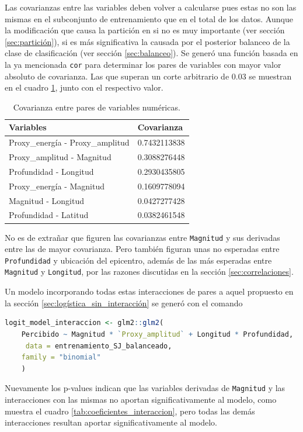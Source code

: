 \documentclass[a4paper]{report}
\begin{document}
Las covarianzas entre las variables deben volver a calcularse pues estas no son las mismas en el subconjunto de entrenamiento que en el total de los datos.
Aunque la modificación que causa la partición en si no es muy importante (ver sección \ref{sec:partición}), si es más significativa la causada por el posterior balanceo de la clase de clasificación (ver sección \ref{sec:balanceo}).
Se generó una función basada en la ya mencionada \lstinline[language=R]{cor} para determinar los pares de variables con mayor valor absoluto de covarianza.
Las que superan un corte arbitrario de \num{0.03} se muestran en el cuadro \ref{tab:covarianza}, junto con el respectivo valor.

\begin{table}[!ht]
	\centering
	\begin{tabular}{ll}
		\toprule
		Variables & Covarianza\\
		\midrule
		Proxy\_energía - Proxy\_amplitud & 0.7432113838\\
		Proxy\_amplitud - Magnitud & 0.3088276448\\
		Profundidad - Longitud & 0.2930435805\\
		Proxy\_energía - Magnitud & 0.1609778094\\
		Magnitud - Longitud & 0.0427277428\\
		Profundidad - Latitud & 0.0382461548\\
		\bottomrule
	\end{tabular}
	\caption{Covarianza entre pares de variables numéricas.}
	\label{tab:covarianza}
\end{table}
No es de extrañar que figuren las covarianzas entre \verb'Magnitud' y sus derivadas entre las de mayor covarianza.
Pero también figuran unas no esperadas entre \verb'Profundidad' y ubicación del epicentro, además de las más esperadas entre \verb'Magnitud' y \verb'Longitud', por las razones discutidas en la sección \ref{sec:correlaciones}.

Un modelo incorporando todas estas interacciones de pares a aquel propuesto en la sección \ref{sec:logística_sin_interacción} se generó con el comando
\begin{lstlisting}[language=R, breaklines=true]
logit_model_interaccion <- glm2::glm2(
	Percibido ~ Magnitud * `Proxy_amplitud` + Longitud * Profundidad,
	 data = entrenamiento_SJ_balanceado,
	family = "binomial"
	)
\end{lstlisting}

Nuevamente los p-values indican que las variables derivadas de \verb'Magnitud' y las interacciones con las mismas no aportan significativamente al modelo, como muestra el cuadro \ref{tab:coeficientes_interaccion}, pero todas las demás interacciones resultan aportar significativamente al modelo.
\end{document}
